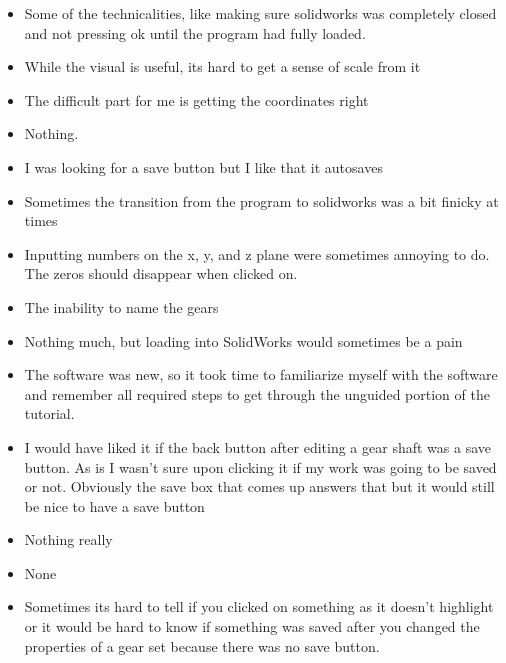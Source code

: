 \begin{itemize}
    \item Some of the technicalities, like making sure solidworks was completely closed and not pressing ok until the program had fully loaded.
    \item While the visual is useful, its hard to get a sense of scale from it
    \item The difficult part for me is getting the coordinates right 
    \item Nothing.
    \item I was looking for a save button but I like that it autosaves 
    \item Sometimes the transition from the program to solidworks was a bit finicky at times 
    \item Inputting numbers on the x, y, and z plane were sometimes annoying to do. The zeros should disappear when clicked on.
    \item The inability to name the gears
    \item Nothing much, but loading into SolidWorks would sometimes be a pain
    \item The software was new, so it took time to familiarize myself with the software and remember all required steps to get through the unguided portion of the tutorial.
    \item I would have liked it if the back button after editing a gear shaft was a save button. As is I wasn't sure upon clicking it if my work was going to be saved or not. Obviously the save box that comes up answers that but it would still be nice to have a save button
    \item Nothing really
    \item None
    \item Sometimes its hard to tell if you clicked on something as it doesn't highlight or it would be hard to know if something was saved after you changed the properties of a gear set because there was no save button. 
\end{itemize}

